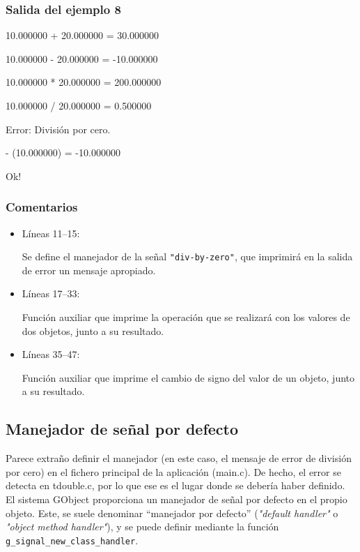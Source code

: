 \subsubsection{Salida del ejemplo 8}
10.000000 + 20.000000 = 30.000000\par
10.000000 - 20.000000 = -10.000000\par
10.000000 * 20.000000 = 200.000000\par
10.000000 / 20.000000 = 0.500000\par
\vspace{1ex}
Error: División por cero.\par
\vspace{1ex}
- (10.000000) = -10.000000\par
Ok!\par

\subsubsection{Comentarios}
\begin{itemize}
\item Líneas 11--15:\par
  Se define el manejador de la señal \texttt{"div-by-zero"}, que imprimirá en la salida de error un
  mensaje apropiado.
\item Líneas 17--33:\par
  Función auxiliar que imprime la operación que se realizará con los valores de dos objetos, junto a
  su resultado.
\item Líneas 35--47:\par
  Función auxiliar que imprime el cambio de signo del valor de un objeto, junto a su resultado.
\end{itemize}

\subsection{Manejador de señal por defecto}
Parece extraño definir el manejador (en este caso, el mensaje de error de división por cero) en
el fichero principal de la aplicación (\textsf{main.c}). De hecho, el error se detecta en \textsf{tdouble.c},
por lo que ese es el lugar donde se debería haber definido. El sistema \textsf{GObject} proporciona
un manejador de señal por defecto en el propio objeto. Este, se suele denominar ``manejador por defecto''
(\emph{"default handler"} o \emph{"object method handler"}), y se puede definir mediante la función \texttt{g\_signal\_new\_class\_handler}.

